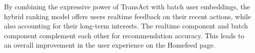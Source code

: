 By combining the expressive power of TransAct with batch user embeddings, the hybrid ranking model offers users realtime feedback on their recent actions, while also accounting for their long-term interests. The realtime component and batch component complement each other for recommendation accuracy. This leads to an overall improvement in the user experience on the Homefeed page.

